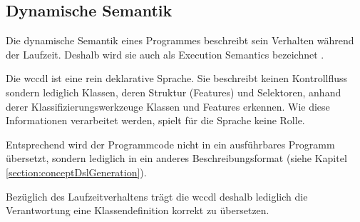 \subsection{Dynamische Semantik}
    Die dynamische Semantik eines Programmes beschreibt sein Verhalten
    während der Laufzeit. Deshalb wird sie auch als Execution Semantics bezeichnet
    \cite[Kapitel 4.3]{voelter:DslEngineering}.

    Die \gls{wccdl} ist eine rein deklarative Sprache.
    Sie beschreibt keinen Kontrollfluss sondern lediglich
    Klassen, deren Struktur (Features) und Selektoren,
    anhand derer Klassifizierungswerkzeuge Klassen und Features erkennen.
    Wie diese Informationen verarbeitet werden, spielt für die Sprache keine Rolle.

    Entsprechend wird der Programmcode nicht in ein ausführbares Programm übersetzt,
    sondern lediglich in ein anderes Beschreibungsformat
    (siehe Kapitel \ref{section:conceptDslGeneration}).

    Bezüglich des Laufzeitverhaltens trägt die \gls{wccdl}
    deshalb lediglich die Verantwortung eine Klassendefinition
    korrekt zu übersetzen.
